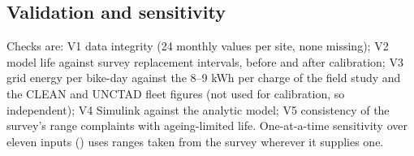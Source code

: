 \subsection{Validation and sensitivity}
Checks are: V1 data integrity (24 monthly values per site, none missing); V2 model life against survey replacement intervals, before and after calibration; V3 grid energy per bike-day against the 8--9 kWh per charge of the field study \cite{chowdhury2026} and the CLEAN and UNCTAD fleet figures \cite{clean2024,unctad_smep} (not used for calibration, so independent); V4 Simulink against the analytic model; V5 consistency of the survey's range complaints with ageing-limited life. One-at-a-time sensitivity over eleven inputs () uses ranges taken from the survey wherever it supplies one.
